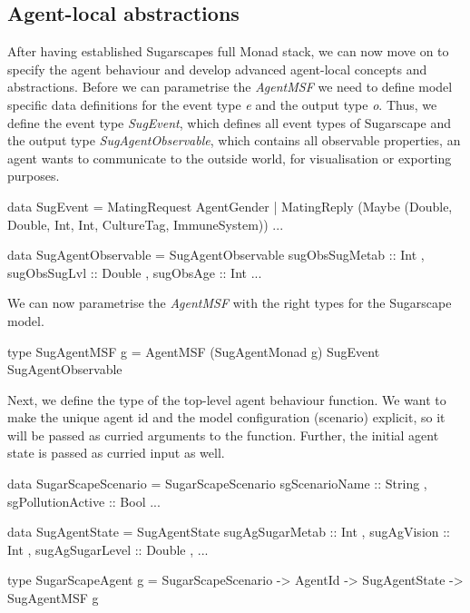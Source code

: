 \subsection{Agent-local abstractions}
After having established Sugarscapes full Monad stack, we can now move on to specify the agent behaviour and develop advanced agent-local concepts and abstractions. Before we can parametrise the \textit{AgentMSF} we need to define model specific data definitions for the event type \textit{e} and the output type \textit{o}. Thus, we define the event type \textit{SugEvent}, which defines all event types of Sugarscape and the output type \textit{SugAgentObservable}, which contains all observable properties, an agent wants to communicate to the outside world, for visualisation or exporting purposes. 

\begin{HaskellCode}
data SugEvent = MatingRequest AgentGender
              | MatingReply 
                 (Maybe (Double, Double, Int, Int, CultureTag, ImmuneSystem))
              ...

data SugAgentObservable = SugAgentObservable
  { sugObsSugMetab :: Int
  , sugObsSugLvl   :: Double
  , sugObsAge      :: Int
  ...  
  }
\end{HaskellCode}

We can now parametrise the \textit{AgentMSF} with the right types for the Sugarscape model.

\begin{HaskellCode}
type SugAgentMSF g = AgentMSF (SugAgentMonad g) SugEvent SugAgentObservable
\end{HaskellCode}

Next, we define the type of the top-level agent behaviour function. We want to make the unique agent id and the model configuration (scenario) explicit, so it will be passed as curried arguments to the function. Further, the initial agent state is passed as curried input as well.

\begin{HaskellCode}
data SugarScapeScenario = SugarScapeScenario 
  { sgScenarioName    :: String
  , sgPollutionActive :: Bool
  ...
  }

data SugAgentState = SugAgentState
  { sugAgSugarMetab :: Int
  , sugAgVision     :: Int
  , sugAgSugarLevel :: Double
  , ...
  }
  
type SugarScapeAgent g 
       = SugarScapeScenario -> AgentId -> SugAgentState -> SugAgentMSF g
\end{HaskellCode}

